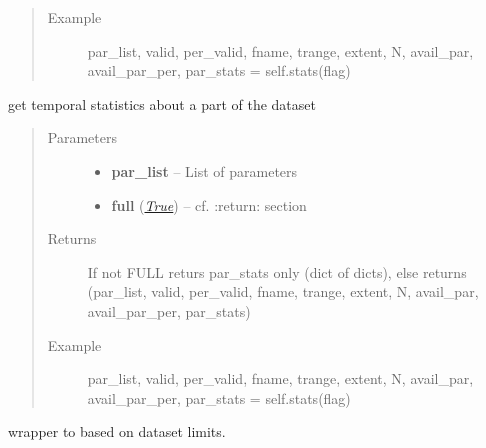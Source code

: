 \documentclass[letterpaper,10pt,english]{sphinxmanual}
\begin{document}
\begin{fulllineitems}
\begin{fulllineitems}
\begin{quote}
\begin{description}
\item[{Example }] \leavevmode
par\_list, valid, per\_valid, fname, trange, extent, N, avail\_par, avail\_par\_per, par\_stats = self.stats(flag)

\end{description}\end{quote}

\end{fulllineitems}


\begin{fulllineitems}
\label{altimetry.data:altimetry.data.hydro_data.get_timestats}
get temporal statistics about a part of the dataset
\begin{quote}\begin{description}
\item[{Parameters}] \leavevmode\begin{itemize}
\item {} 
\textbf{par\_list} -- List of parameters

\item {} 
\textbf{full} (\href{http://docs.python.org/library/constants.html\#True}{\emph{True}}) -- cf. :return: section

\end{itemize}

\item[{Returns}] \leavevmode
If not FULL returs par\_stats only (dict of dicts), else returns (par\_list, valid, per\_valid, fname, trange, extent, N, avail\_par, avail\_par\_per, par\_stats)

\item[{Example }] \leavevmode
par\_list, valid, per\_valid, fname, trange, extent, N, avail\_par, avail\_par\_per, par\_stats = self.stats(flag)

\end{description}\end{quote}

\end{fulllineitems}


\begin{fulllineitems}
\label{altimetry.data:altimetry.data.hydro_data.in_limits}
wrapper to  based on dataset limits.


\end{fulllineitems}
\end{fulllineitems}
\end{document}
